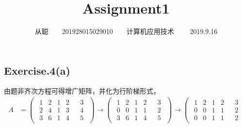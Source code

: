 \documentclass[UTF8,12pt, a4paper,fleqn]{ctexart}
\title{Assignment1}
\author{从聪\ \ \ \ 201928015029010\ \ \ \ 计算机应用技术  \ \ \ \ 2019.9.16}
\date{}
\begin{document}
  \maketitle
  \subsection*{Exercise.4(a)}
由题非齐次方程可得增广矩阵，并化为行阶梯形式，\\
  \begin{equation*}
  \begin{split}
    A&=\left(
      \begin{array}{c|c}
        \begin{matrix}
          1 & 2 & 1 & 2 \\
          2 & 4 & 1 & 3 \\
          3 & 6 & 1 & 4 
        \end{matrix} & 
        \begin{matrix}
          3 \\
          4 \\
          5
        \end{matrix}
      \end{array}
    \right) \rightarrow
    \left(
      \begin{array}{c|c}
        \begin{matrix}
          1 & 2 & 1 & 2 \\
          0 & 0 & 1 & 1 \\
          3 & 6 & 1 & 4 
        \end{matrix} & 
        \begin{matrix}
          3 \\
          2 \\
          5
        \end{matrix}
      \end{array}
    \right) \rightarrow
    \left(
      \begin{array}{c|c}
        \begin{matrix}
          1 & 2 & 1 & 2 \\
          0 & 0 & 1 & 1 \\
          0 & 0 & 1 & 1 
        \end{matrix} & 
        \begin{matrix}
          3 \\
          2 \\
          2
        \end{matrix}
      \end{array}

\end{split}
\end{equation*}
\end{document}
